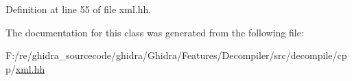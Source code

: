 Definition at line 55 of file xml.\+hh.



The documentation for this class was generated from the following file\+:\begin{DoxyCompactItemize}
\item 
F\+:/re/ghidra\+\_\+sourcecode/ghidra/\+Ghidra/\+Features/\+Decompiler/src/decompile/cpp/\mbox{\hyperlink{xml_8hh}{xml.\+hh}}\end{DoxyCompactItemize}
